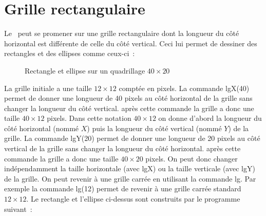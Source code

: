 \section{Grille rectangulaire}

Le \robot\ peut se promener sur une grille rectangulaire dont la longueur du côté
horizontal est différente de celle du côté
vertical. Ceci lui per\-met de des\-sin\-er des rec\-tan\-gles et des el\-lip\-ses com\-me ceux-ci~:
\begin{figure}[htbp]
 \caption{Rectangle et ellipse sur un quadrillage $40 \times 20$}
\end{figure}

 La grille initiale a une taille $12 \times 12$ comptée en pixels. La commande {\idt lgX(40)} permet de donner
 une longueur de 40 pixels au côté horizontal de la grille sans changer la longueur du côté vertical. après
 cette commande la grille a donc une taille $40 \times 12$ pixels. Dans cette notation $40 \times 12$ on donne
 d'abord la longueur du côté horizontal (nommé $X$) puis la longueur du côté vertical (nommé $Y$)
 de la grille. La commande {\idt lgY(20)} permet de donner
 une longueur de 20 pixels au côté vertical de la grille sans changer la longueur du côté horizontal. après
 cette commande la grille a donc une taille $40 \times 20$ pixels. On peut donc changer indépendamment la
  taille horizontale (avec {\idt lgX}) ou la taille verticale (avec {\idt lgY}) de la grille. 
  On peut revenir à une grille carrée en utilisant la commande {\idt lg}.
  Par exemple la commande {\idt lg(12)}
  permet de revenir à une grille carrée standard $12 \times 12$. Le rectangle et l'ellipse
 ci-dessus 
  sont construits par le programme suivant~:\hfill
 
 
